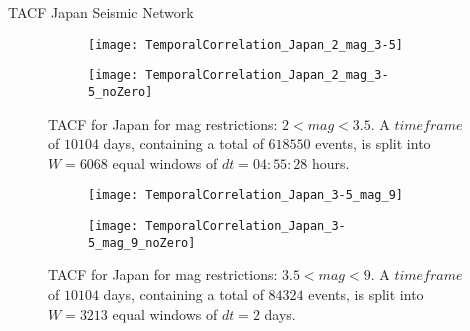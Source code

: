 \begin{frame}{TACF Japan Seismic Network}

\begin{figure}[!ht]
\begin{subfigure}{.5\textwidth}
  \centering
  \texttt{[image: TemporalCorrelation\_Japan\_2\_mag\_3-5]}
  \label{fig:corrJapan2_3.5}
\end{subfigure}%
\begin{subfigure}{.5\textwidth}
  \centering
  \texttt{[image: TemporalCorrelation\_Japan\_2\_mag\_3-5\_noZero]}
  \label{fig:corrJapan2_3.5_noZero}
\end{subfigure}
\caption{TACF for Japan for mag restrictions: $2<mag<3.5$. A $timeframe$ of $10104$ days, containing a total of $618550$ events, is split into $W=6068$ equal windows of $dt=04:55:28$ hours.}
\label{fig:corrJapan2_3.5!}
\end{figure}


\begin{figure}[!ht]
\begin{subfigure}{.5\textwidth}
  \centering
  \texttt{[image: TemporalCorrelation\_Japan\_3-5\_mag\_9]}
  \label{fig:corrJapan3.5_9}
\end{subfigure}%
\begin{subfigure}{.5\textwidth}
  \centering
  \texttt{[image: TemporalCorrelation\_Japan\_3-5\_mag\_9\_noZero]}
  \label{fig:corrJapan3.5_9_noZero}
\end{subfigure}
\caption{TACF for Japan for mag restrictions: $3.5<mag<9$. A $timeframe$ of $10104$ days, containing a total of $84324$ events, is split into $W=3213$ equal windows of $dt=2$ days.}
\label{fig:corrJapan3.5_9!}
\end{figure}
\end{frame}

\begin{comment}
\begin{frame}
By analyzing the TACFs for earthquakes with $2<magnitude<3.5$, the events can be interpreted as fluctuations that exhibit a chaotic behaviour and at larger magnitudes, above $3.5$, this behaviour is lost. Here, peaks are recognized at certain lags suggesting a correlation between events at certain time intervals. This can be an indication that large events are more likely than not to be separated by these time frames. For example, in Vrancea we recognize a couple of peaks at around $30$ lags, which would translate as $\sim 12.65$ years. This means that it is possible for some large events to have a $12.65$ years span between them.\par 
\end{frame}
\end{comment}
